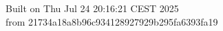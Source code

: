 {\noindent Built on Thu Jul 24 20:16:21 CEST 2025} \\ 
 {\noindent from 21734a18a8b96c934128927929b295fa6393fa19}
